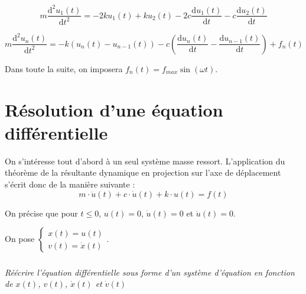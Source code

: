 \documentclass[10pt]{article}
\newif\ifprof
\begin{document}
\begin{equation}
m\dfrac{\text{d}^2u_1(t)}{\text{d}t^2} = 
- 2k u_1(t) + k u_2 (t) 
-2c \dfrac{\text{d}u_1(t)}{\text{d}t} 
- c \dfrac{\text{d}u_2(t)}{\text{d}t} 
\end{equation}

\begin{equation}
m\dfrac{\text{d}^2u_n(t)}{\text{d}t^2} = 
-k\left(u_n(t)-u_{n-1}(t) \right)   - c\left(\dfrac{\text{d}u_{n}(t)}{\text{d}t}-\dfrac{\text{d}u_{n-1}(t)}{\text{d}t} \right) +f_n(t)
\end{equation}


Dans toute la suite, on imposera $f_n(t)=f_{max} \sin \left(\omega t\right)$.

\section{Résolution d'une équation différentielle}
On s'intéresse tout d'abord à un seul système masse ressort. L'application du théorème de la résultante dynamique en projection sur l'axe de déplacement s'écrit donc 
de la manière suivante : 
$$
m\cdot\ddot{u}(t)+c\cdot \dot{u}(t) + k\cdot u(t) = f(t)
$$

On précise que pour $t\leq 0$, $u(t)=0$, $\dot{u}(t)=0$ et $\ddot{u}(t)=0$.

On pose $\left\{ \begin{array}{l} x(t) = u(t) \\ v(t) = \dot{x}(t)\end{array} \right.$.

\subparagraph{}
\textit{Réécrire l'équation différentielle sous forme d'un système d'équation en fonction de $x(t)$,  $v(t)$, $\dot{x}(t)$ et $\dot{v}(t)$}
\ifprof
\begin{corrige}
On a donc : 
$$
\left\{ 
\begin{array}{l} 
v(t) = \dot{x}(t) \\ 
m\cdot\dot{v}(t)+c\cdot {v}(t) + k\cdot x(t) = f(t)
\end{array} \right.
$$
\end{corrige}
\else
\fi

%
\end{document}
